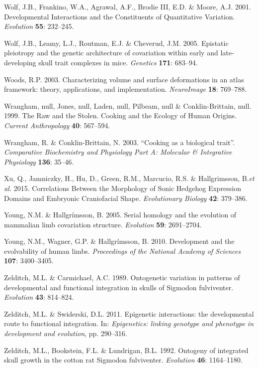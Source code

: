 \documentclass[12pt,twoside]{report}
\begin{document}
Wolf, J.B., Frankino, W.A., Agrawal, A.F., Brodie III, E.D. \& Moore,
A.J. 2001. Developmental Interactions and the Constituents of
Quantitative Variation. \emph{Evolution} \textbf{55}: 232--245.

Wolf, J.B., Leamy, L.J., Routman, E.J. \& Cheverud, J.M. 2005. Epistatic
pleiotropy and the genetic architecture of covariation within early and
late-developing skull trait complexes in mice. \emph{Genetics}
\textbf{171}: 683--94.

Woods, R.P. 2003. Characterizing volume and surface deformations in an
atlas framework: theory, applications, and implementation.
\emph{NeuroImage} \textbf{18}: 769--788.

Wrangham, null, Jones, null, Laden, null, Pilbeam, null \&
Conklin-Brittain, null. 1999. The Raw and the Stolen. Cooking and the
Ecology of Human Origins. \emph{Current Anthropology} \textbf{40}:
567--594.

Wrangham, R. \& Conklin-Brittain, N. 2003. ``Cooking as a biological
trait''. \emph{Comparative Biochemistry and Physiology Part A: Molecular
\& Integrative Physiology} \textbf{136}: 35--46.

Xu, Q., Jamniczky, H., Hu, D., Green, R.M., Marcucio, R.S. \&
Hallgrimsson, B.\emph{et al.} 2015. Correlations Between the Morphology
of Sonic Hedgehog Expression Domains and Embryonic Craniofacial Shape.
\emph{Evolutionary Biology} \textbf{42}: 379--386.

Young, N.M. \& Hallgrímsson, B. 2005. Serial homology and the evolution
of mammalian limb covariation structure. \emph{Evolution} \textbf{59}:
2691--2704.

Young, N.M., Wagner, G.P. \& Hallgrímsson, B. 2010. Development and the
evolvability of human limbs. \emph{Proceedings of the National Academy
of Sciences} \textbf{107}: 3400--3405.

Zelditch, M.L. \& Carmichael, A.C. 1989. Ontogenetic variation in
patterns of developmental and functional integration in skulls of
Sigmodon fulviventer. \emph{Evolution} \textbf{43}: 814--824.

Zelditch, M.L. \& Swiderski, D.L. 2011. Epigenetic interactions: the
developmental route to functional integration. In: \emph{Epigenetics:
linking genotype and phenotype in development and evolution}, pp.
290--316.

Zelditch, M.L., Bookstein, F.L. \& Lundrigan, B.L. 1992. Ontogeny of
integrated skull growth in the cotton rat Sigmodon fulviventer.
\emph{Evolution} \textbf{46}: 1164--1180.
\end{document}

